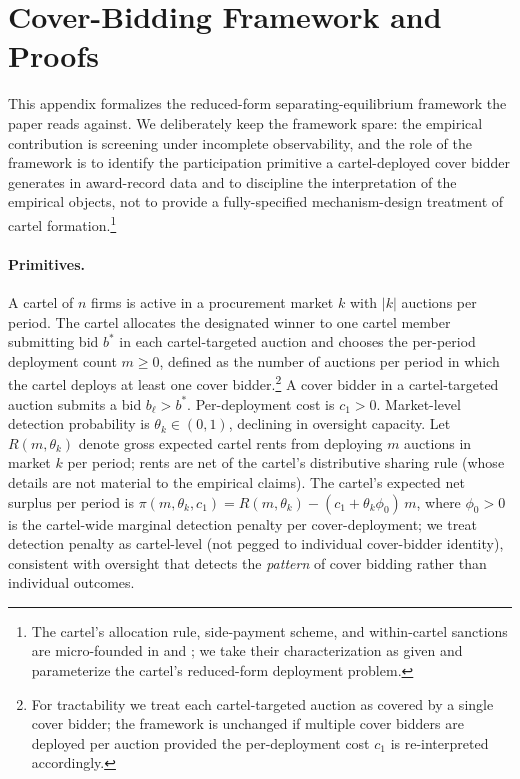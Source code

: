 \section{Cover-Bidding Framework and Proofs}\label{app:proofs}

This appendix formalizes the reduced-form separating-equilibrium
framework the paper reads against. We deliberately keep the
framework spare: the empirical contribution is screening under
incomplete observability, and the role of the framework is to
identify the participation primitive a cartel-deployed cover
bidder generates in award-record data and to discipline the
interpretation of the empirical objects, not to provide a
fully-specified mechanism-design treatment of cartel
formation.\footnote{The cartel's allocation rule, side-payment
scheme, and within-cartel sanctions are micro-founded in
\citet{marshall2012economics} and \citet{asker2010leniency};
we take their characterization as given and parameterize the
cartel's reduced-form deployment problem.}

\paragraph{Primitives.} A cartel of $n$ firms is active in a
procurement market $k$ with $|k|$ auctions per period. The
cartel allocates the designated winner to one cartel member
submitting bid $b^*$ in each cartel-targeted auction and chooses
the per-period deployment count $m \geq 0$, defined as the
number of auctions per period in which the cartel deploys at
least one cover bidder.\footnote{For tractability we treat each
cartel-targeted auction as covered by a single cover bidder;
the framework is unchanged if multiple cover bidders are deployed
per auction provided the per-deployment cost $c_1$ is
re-interpreted accordingly.} A cover bidder in a cartel-targeted
auction submits a bid $b_\ell > b^*$. Per-deployment cost is
$c_1 > 0$. Market-level detection probability is
$\theta_k \in (0,1)$, declining in oversight capacity. Let
$R(m, \theta_k)$ denote gross expected cartel rents from
deploying $m$ auctions in market $k$ per period; rents are net
of the cartel's distributive sharing rule (whose details are not
material to the empirical claims). The cartel's expected net
surplus per period is
$\pi(m, \theta_k, c_1) = R(m, \theta_k) - (c_1 + \theta_k
\phi_0)\,m$, where $\phi_0 > 0$ is the cartel-wide marginal
detection penalty per cover-deployment; we treat detection
penalty as cartel-level (not pegged to individual cover-bidder
identity), consistent with oversight that detects the
\emph{pattern} of cover bidding rather than individual
outcomes.

